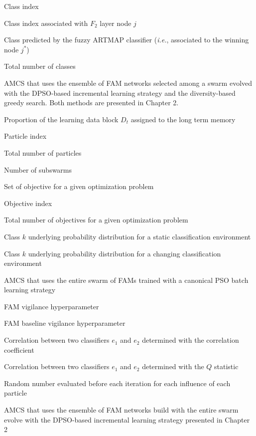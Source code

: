 \item [$k$] Class index
\item [$k(j)$] Class index associated with $F_2$ layer node $j$
\item [$k^*$] Class predicted by the fuzzy ARTMAP classifier (\emph{i.e.}, associated to the winning node $j^*$)
\item [$K$] Total number of classes
\item [LBESTS$_\text{+d}$] AMCS that uses the ensemble of FAM networks selected among a swarm evolved with the DPSO-based incremental learning strategy and the diversity-based greedy search. Both methods are presented in Chapter 2.
\item [$\lambda_D$] Proportion of the learning data block $D_t$ assigned to the long term memory
\item [$n$] Particle index
\item [$N$] Total number of particles
\item [$N_\text{ss}$] Number of subswarms
\item [$\mathbf{o}$] Set of objective for a given optimization problem
\item [$o$] Objective index
\item [$O$] Total number of objectives for a given optimization problem
\item [$p_k(\textbf{a})$] Class $k$ underlying probability distribution for a static classification environment
\item [$p_k(\textbf{a},t)$] Class $k$ underlying probability distribution for a changing classification environment
\item [PSO$_\text{B}$] AMCS that uses the entire swarm of FAMs trained with a canonical PSO batch learning strategy
\item [$\rho$] FAM vigilance hyperparameter
\item [$\bar{\rho}$] FAM baseline vigilance hyperparameter
\item [$rho_{e_1e_2}$] Correlation between two classifiers $e_1$ and $e_2$ determined with the correlation coefficient
\item [$Q_{e_1e_2}$] Correlation between two classifiers $e_1$ and $e_2$ determined with the $Q$ statistic
\item [$r_{\theta}$] Random number evaluated before each iteration for each influence of each particle
\item [SWARM] AMCS that uses the ensemble of FAM networks build with the entire swarm evolve with the DPSO-based incremental learning strategy presented in Chapter 2
